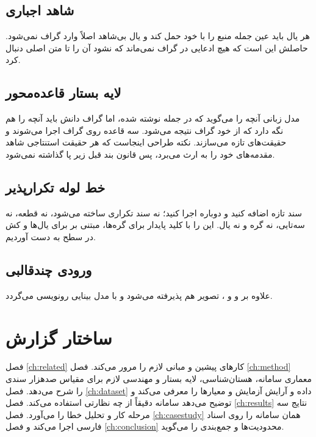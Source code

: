 \subsection{شاهد اجباری}
\label{sec:c-evidence}

هر یال باید عین جمله منبع را با خود حمل کند و یال بی‌شاهد اصلاً وارد گراف نمی‌شود. حاصلش این است که هیچ ادعایی در گراف نمی‌ماند که نشود آن را تا متن اصلی دنبال کرد.

\subsection{لایه بستار قاعده‌محور}
\label{sec:c-closure}

مدل زبانی آنچه را می‌گوید که در جمله نوشته شده، اما گراف دانش باید آنچه را هم نگه دارد که از خود گراف نتیجه می‌شود. سه قاعده روی گراف اجرا می‌شوند و حقیقت‌های تازه می‌سازند. نکته طراحی اینجاست که هر حقیقت استنتاجی شاهد مقدمه‌های خود را به ارث می‌برد، پس قانون بند قبل زیر پا گذاشته نمی‌شود.

\subsection{خط لوله تکرارپذیر}
\label{sec:c-idempotent}

سند تازه اضافه کنید و دوباره اجرا کنید؛ نه سند تکراری ساخته می‌شود، نه قطعه، نه سه‌تایی، نه گره و نه یال. این را با کلید پایدار  برای گره‌ها،  مبتنی بر  برای یال‌ها و کش در سطح  به دست آوردیم.

\subsection{ورودی چندقالبی}
\label{sec:c-input}

علاوه بر  و  و ، تصویر هم پذیرفته می‌شود و با مدل بینایی رونویسی می‌گردد.

\section{ساختار گزارش}
\label{sec:structure}

فصل \ref{ch:related} کارهای پیشین و مبانی لازم را مرور می‌کند. فصل \ref{ch:method} معماری سامانه، هستان‌شناسی، لایه بستار و مهندسی لازم برای مقیاس صدهزار سندی را شرح می‌دهد. فصل \ref{ch:dataset} داده و آرایش آزمایش و معیارها را معرفی می‌کند و توضیح می‌دهد سامانه دقیقاً از چه نظارتی استفاده می‌کند. فصل \ref{ch:results} نتایج سه مرحله کار و تحلیل خطا را می‌آورد. فصل \ref{ch:casestudy} همان سامانه را روی اسناد فارسی اجرا می‌کند و فصل \ref{ch:conclusion} محدودیت‌ها و جمع‌بندی را می‌گوید.
